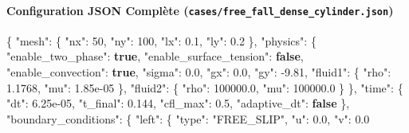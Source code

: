\documentclass[
  10pt,
]{article}
\newenvironment{Shaded}{}{}
\newcommand{\DataTypeTok}[1]{\textcolor[rgb]{0.56,0.13,0.00}{#1}}
\newcommand{\DecValTok}[1]{\textcolor[rgb]{0.25,0.63,0.44}{#1}}
\newcommand{\FloatTok}[1]{\textcolor[rgb]{0.25,0.63,0.44}{#1}}
\newcommand{\FunctionTok}[1]{\textcolor[rgb]{0.02,0.16,0.49}{#1}}
\newcommand{\KeywordTok}[1]{\textcolor[rgb]{0.00,0.44,0.13}{\textbf{#1}}}
\newcommand{\StringTok}[1]{\textcolor[rgb]{0.25,0.44,0.63}{#1}}
\begin{document}
\paragraph{\texorpdfstring{Configuration JSON Complète
(\texttt{cases/free\_fall\_dense\_cylinder.json})}{Configuration JSON Complète (cases/free\_fall\_dense\_cylinder.json)}}\label{configuration-json-compluxe8te-casesfree_fall_dense_cylinder.json}

\begin{Shaded}
\begin{Highlighting}[]
\FunctionTok{\{}
  \DataTypeTok{"mesh"}\FunctionTok{:} \FunctionTok{\{}
    \DataTypeTok{"nx"}\FunctionTok{:} \DecValTok{50}\FunctionTok{,}
    \DataTypeTok{"ny"}\FunctionTok{:} \DecValTok{100}\FunctionTok{,}
    \DataTypeTok{"lx"}\FunctionTok{:} \FloatTok{0.1}\FunctionTok{,}
    \DataTypeTok{"ly"}\FunctionTok{:} \FloatTok{0.2}
  \FunctionTok{\},}
  \DataTypeTok{"physics"}\FunctionTok{:} \FunctionTok{\{}
    \DataTypeTok{"enable\_two\_phase"}\FunctionTok{:} \KeywordTok{true}\FunctionTok{,}
    \DataTypeTok{"enable\_surface\_tension"}\FunctionTok{:} \KeywordTok{false}\FunctionTok{,}
    \DataTypeTok{"enable\_convection"}\FunctionTok{:} \KeywordTok{true}\FunctionTok{,}
    \DataTypeTok{"sigma"}\FunctionTok{:} \FloatTok{0.0}\FunctionTok{,}
    \DataTypeTok{"gx"}\FunctionTok{:} \FloatTok{0.0}\FunctionTok{,}
    \DataTypeTok{"gy"}\FunctionTok{:} \FloatTok{{-}9.81}\FunctionTok{,}
    \DataTypeTok{"fluid1"}\FunctionTok{:} \FunctionTok{\{}
      \DataTypeTok{"rho"}\FunctionTok{:} \FloatTok{1.1768}\FunctionTok{,}
      \DataTypeTok{"mu"}\FunctionTok{:} \FloatTok{1.85e{-}05}
    \FunctionTok{\},}
    \DataTypeTok{"fluid2"}\FunctionTok{:} \FunctionTok{\{}
      \DataTypeTok{"rho"}\FunctionTok{:} \FloatTok{100000.0}\FunctionTok{,}
      \DataTypeTok{"mu"}\FunctionTok{:} \FloatTok{100000.0}
    \FunctionTok{\}}
  \FunctionTok{\},}
  \DataTypeTok{"time"}\FunctionTok{:} \FunctionTok{\{}
    \DataTypeTok{"dt"}\FunctionTok{:} \FloatTok{6.25e{-}05}\FunctionTok{,}
    \DataTypeTok{"t\_final"}\FunctionTok{:} \FloatTok{0.144}\FunctionTok{,}
    \DataTypeTok{"cfl\_max"}\FunctionTok{:} \FloatTok{0.5}\FunctionTok{,}
    \DataTypeTok{"adaptive\_dt"}\FunctionTok{:} \KeywordTok{false}
  \FunctionTok{\},}
  \DataTypeTok{"boundary\_conditions"}\FunctionTok{:} \FunctionTok{\{}
    \DataTypeTok{"left"}\FunctionTok{:} \FunctionTok{\{}
      \DataTypeTok{"type"}\FunctionTok{:} \StringTok{"FREE\_SLIP"}\FunctionTok{,}
      \DataTypeTok{"u"}\FunctionTok{:} \FloatTok{0.0}\FunctionTok{,}
      \DataTypeTok{"v"}\FunctionTok{:} \FloatTok{0.0}

\end{Highlighting}
\end{Shaded}
\end{document}
